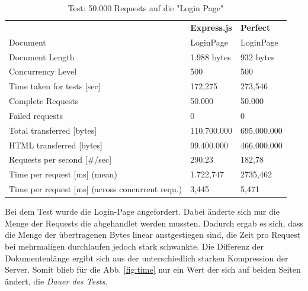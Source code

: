 \begin{table}[H]
\begin{center}
\begin{tabular}{p{8cm}p{2.5cm}p{2.5cm}}
\rowcolor{gray20}														& \textbf{Express.js}	  		& \textbf{Perfect}		\\ 
\rowcolor{gray5}		Document 											& LoginPage					& LoginPage			\\ 
\rowcolor{gray20}	Document Length										& 1.988 bytes				& 932 bytes			\\ 
\rowcolor{gray5}		Concurrency Level									& 500						& 500				\\ 
\rowcolor{gray20}	Time taken for tests [sec]								& 172,275					& 273,546			\\ 
\rowcolor{gray5}		Complete Requests									& 50.000					& 50.000			\\
\rowcolor{gray20}	Failed requests										& 0							& 0					\\ 
\rowcolor{gray5}		Total transferred [bytes]								& 110.700.000				& 695.000.000		\\ 
\rowcolor{gray20}	HTML transferred	[bytes]								& 99.400.000				& 466.000.000		\\ 
\rowcolor{gray5}		Requests per second [\#/sec]							& 290,23					& 182,78			\\ 
\rowcolor{gray20}	Time per request [ms]	 (mean)							& 1.722,747					& 2735,462			\\
\rowcolor{gray5}		Time per request [ms]	 (across concurrent requ.)			& 3,445						& 5,471				\\ 
\end{tabular}
\caption{Test: 50.000 Requests auf die "Login Page"} \label{tab:fiftythousandrequests}
\end{center}
\end{table}

Bei dem Test wurde die Login-Page angefordert. Dabei änderte sich nur die Menge der Requests die abgehandlet werden mussten. Dadurch ergab es sich, dass die Menge der übertragenen Bytes linear anstgestiegen sind, die Zeit pro Request bei mehrmaligen durchlaufen jedoch stark schwankte. Die Differenz der Dokumentenlänge ergibt sich aus der unterschiedlich starken Kompression der Server. Somit blieb für die Abb. \ref{fig:time} nur ein Wert der sich auf beiden Seiten ändert, die \textit{Dauer des Tests}.

